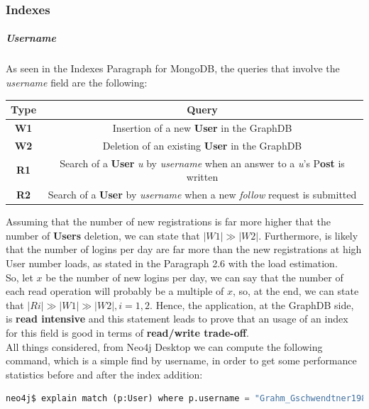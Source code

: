 \subsubsection{Indexes}
\subparagraph{Username} As seen in the Indexes Paragraph for MongoDB, the queries that involve the \textit{username} field are the following:
\begin{center}
	\begin{tabular}{|c | c |} 
		\hline
		\textbf{Type} & \textbf{Query} \\ [0.5ex] 
		\hline
		\textbf{W1} & Insertion of a new \textbf{User} in the GraphDB\\ 
		\hline
		\textbf{W2} & Deletion of an existing \textbf{User} in the GraphDB \\
		\hline
		\textbf{R1} & Search of a \textbf{User} \textit{u} by \textit{username} when an answer to a \textit{u}'s P\textbf{ost} is written \\
		\hline
		\textbf{R2} & Search of a \textbf{User} by \textit{username} when a new \textit{follow} request is submitted \\
		\hline
	\end{tabular}
\end{center}
Assuming that the number of new registrations is far more higher that the number of \textbf{Users} deletion, we can state that $|W1| \gg |W2|$. Furthermore, is likely that the number of logins per day are far more than the new registrations at high User number loads, as stated in the Paragraph 2.6 with the load estimation.\\
So, let $x$ be the number of new logins per day, we can say that the number of each read operation will probably be a multiple of $x$, so, at the end, we can state that $|Ri| \gg |W1| \gg |W2|, i = 1,2$. Hence, the application, at the GraphDB side, is \textbf{read intensive} and this statement leads to prove that an usage of an index for this field is good in terms of \textbf{read/write trade-off}.\\
All things considered, from Neo4j Desktop we can compute the following command, which is a simple find by username, in order to get some performance statistics before and after the index addition:
\begin{lstlisting}[language=python]
	neo4j$ explain match (p:User) where p.username = "Grahm_Gschwendtner1989" return p
\end{lstlisting}


